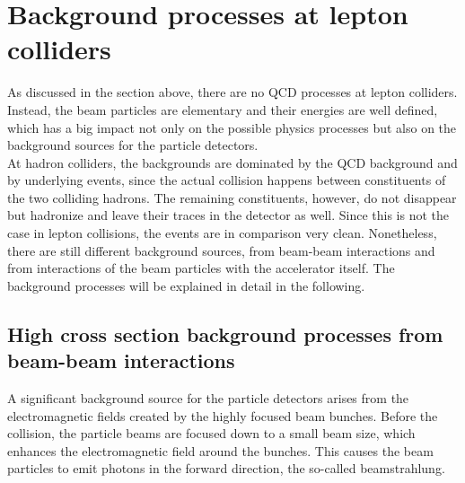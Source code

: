 \section{Background processes at lepton colliders}
\label{Backgrounds}
As discussed in the section above, there are no QCD processes at lepton colliders.
Instead, the beam particles are elementary and their energies are well defined, which has a big impact not only on the possible physics processes but also on the background sources for the particle detectors.
\\At hadron colliders, the backgrounds are dominated by the QCD background and by underlying events, since the actual collision happens between constituents of the two colliding hadrons.
The remaining constituents, however, do not disappear but hadronize and leave their traces in the detector as well.
Since this is not the case in lepton collisions, the events are in comparison very clean.
Nonetheless, there are still different background sources, from beam-beam interactions and from interactions of the beam particles with the accelerator itself.
The background processes will be explained in detail in the following.

\subsection{High cross section background processes from beam-beam interactions}
\label{BeamBeam}
A significant background source for the particle detectors arises from the electromagnetic fields created by the highly focused beam bunches.
Before the collision, the particle beams are focused down to a small beam size, which enhances the electromagnetic field around the bunches.
This causes the beam particles to emit photons in the forward direction, the so-called beamstrahlung.

